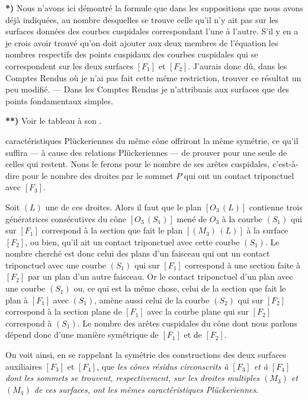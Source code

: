 \documentclass{article}
\begin{document}
\textbf{*)} Nous n'avons ici démontré la formule que dans les suppositions que nous avons déjà indiquées, au nombre desquelles se trouve celle qu'il n'y ait pas sur les surfaces données des courbes cuspidales correspondant l'une à l'autre. S'il y en a je crois avoir trouvé qu'on doit ajouter aux deux membres de l'équation les nombres respectifs des points cuspidaux des courbes cuspidales qui se correspondent sur les deux surfaces $[F_1]$ et $[F_2]$. J'aurais donc dû, dans les Comptes Rendus où je n'ai pas fait cette même restriction, trouver ce résultat un peu modifié. --- Dans les Comptes Rendus je n'attribuais aux surfaces que des points fondamentaux simples.

\textbf{**)} Voir le tableau à son .

caractéristiques Plückeriennes du même cône offriront la même symétrie, ce qu'il suffira --- à cause des relations Plückeriennes --- de prouver pour une seule de celles qui restent. Nous le ferons pour le nombre de ses arêtes cuspidales, c'est-à-dire pour le nombre des droites par le sommet $P$ qui ont un contact triponctuel avec $[F_3]$.

Soit $(L)$ une de ces droites. Alors il faut que le plan $[O_3\,(L)]$ contienne trois génératrices consécutives du cône $[O_3\,(S_1)]$ mené de $O_3$ à la courbe $(S_1)$ qui sur $[F_1]$ correspond à la section que fait le plan $[(M_3)\,(L)]$ à la surface $[F_2]$, ou bien, qu'il ait un contact triponctuel avec cette courbe $(S_1)$. Le nombre cherché est donc celui des plans d'un faisceau qui ont un contact triponctuel avec une courbe $(S_1)$ qui sur $[F_1]$ correspond à une section faite à $[F_2]$ par un plan d'un autre faisceau. Or le contact triponctuel d'un plan avec une courbe $(S_1)$ ou, ce qui est la même chose, celui de la section que fait le plan à $[F_1]$ avec $(S_1)$, amène aussi celui de la courbe $(S_2)$ qui sur $[F_2]$ correspond à la section plane de $[F_1]$ avec la courbe plane qui sur $[F_2]$ correspond à $(S_1)$. Le nombre des arêtes cuspidales du cône dont nous parlons dépend donc d'une manière symétrique de $[F_1]$ et de $[F_2]$.

On voit ainsi, en se rappelant la symétrie des constructions des deux surfaces auxiliaires $[F_3]$ et $[F_4]$, que \emph{les cônes résidus circonscrits à $[F_3]$ et à $[F_4]$ dont les sommets se trouvent, respectivement, sur les droites multiples $(M_3)$ et $(M_4)$ de ces surfaces, ont les mêmes caractéristiques Plückeriennes}.
\end{document}
